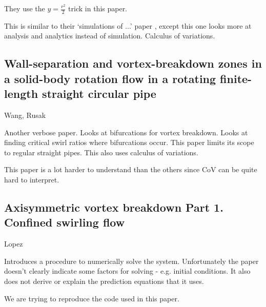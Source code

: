 \documentclass{X:/Documents/Coding/Latex/myreport}
\begin{document}
They use the $y = \frac{r^2}{2}$ trick in this paper.

This is similar to their `simulations of ...' paper , except this one looks more at analysis and analytics instead of simulation.
Calculus of variations.

\subsection{Wall-separation and vortex-breakdown zones in a solid-body rotation flow in a rotating finite-length straight circular pipe}
Wang, Rusak

Another verbose paper. Looks at bifurcations for vortex breakdown. Looks at finding critical swirl ratios where bifurcations occur. This paper limits its scope to regular straight pipes. This also uses calculus of variations.

This paper is a lot harder to understand than the others since CoV can be quite hard to interpret.



\subsection{Axisymmetric vortex breakdown Part 1. Confined swirling flow}

Lopez

Introduces a procedure to numerically solve the system. Unfortunately the paper doesn't clearly indicate some factors for solving - e.g. initial conditions. It also does not derive or explain the prediction equations that it uses.


We are trying to reproduce the code used in this paper.












\clearpage



 
\end{document}
